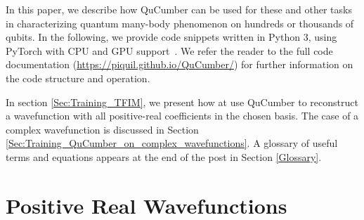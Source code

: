 \documentclass[submission, Phys]{SciPost}
\begin{document}
In this paper, we describe how QuCumber can be used for these and other tasks in characterizing quantum many-body phenomenon on hundreds or thousands of qubits.
In the following, we provide code snippets written in Python 3, using PyTorch with CPU and GPU support~\cite{paszke2017automatic}.
We refer the reader to the full code documentation (\url{https://piquil.github.io/QuCumber/}) for further information on the code structure and operation.





In section \ref{Sec:Training_TFIM}, we present how at use QuCumber to reconstruct a wavefunction with all positive-real coefficients in the chosen basis.
The case of a complex wavefunction is discussed in Section \ref{Sec:Training_QuCumber_on_complex_wavefunctions}. A glossary of useful terms and equations appears at the end of the post in Section \ref{Glossary}.


\section{Positive Real Wavefunctions}
\end{document}
